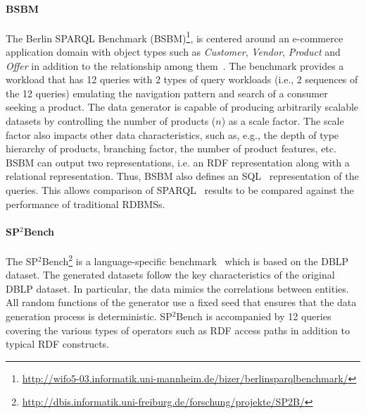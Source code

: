 \paragraph{BSBM} The Berlin SPARQL Benchmark (BSBM)\footnote{\url{http://wifo5-03.informatik.uni-mannheim.de/bizer/berlinsparqlbenchmark/}}, is centered around an e-commerce application domain with object types such as \emph{Customer}, \emph{Vendor}, \emph{Product} and \emph{Offer} in addition to the relationship among them~\cite{Bizer09theberlin}.
The benchmark provides a workload that has 12 queries with 2 types of query workloads (i.e., 2 sequences of the 12 queries) emulating the navigation pattern and search of a consumer seeking a product. The data generator is capable of producing arbitrarily scalable datasets by controlling the number of products ($n$) as a scale factor.  The scale factor also impacts other data characteristics, such as, e.g., the depth of type hierarchy of products, branching factor, the number of product features,  etc. BSBM can output two representations, i.e. an RDF representation along with a relational representation. Thus, BSBM also defines an SQL~\cite{sql} representation of the queries. This allows comparison of SPARQL~\cite{sparql} results  to be compared against the performance of traditional RDBMSs.


\paragraph{SP$^2$Bench} The SP$^2$Bench\footnote{\url{http://dbis.informatik.uni-freiburg.de/forschung/projekte/SP2B/}} is a language-specific benchmark~\cite{Schmidt2010} which is based on the DBLP dataset. %
The generated datasets follow the key characteristics of the original DBLP dataset. In particular, the data mimics the correlations between entities. All random functions of the generator use a fixed seed that ensures that the data generation process is deterministic. SP$^2$Bench is accompanied by 12 queries covering the various types of operators such as RDF access paths in addition to typical RDF constructs.


